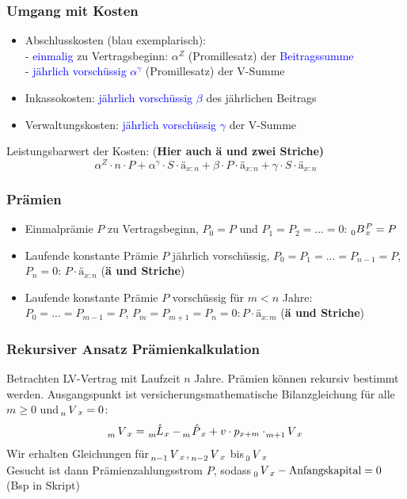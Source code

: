 \documentclass[12pt]{report}
\theoremstyle{dotless}
\theoremstyle{definition}
\begin{document}
\subsubsection{Umgang mit Kosten}
\begin{itemize}
\item Abschlusskosten (blau exemplarisch):\\
- \textcolor{blue}{einmalig} zu Vertragsbeginn: $\alpha^Z$ (Promillesatz) der \textcolor{blue}{Beitragssumme}\\
- \textcolor{blue}{jährlich vorschüssig $\alpha^\gamma$} (Promillesatz) der V-Summe
\item Inkassokosten: \textcolor{blue}{jährlich vorschüssig $\beta$} des jährlichen Beitrags
\item Verwaltungskosten: \textcolor{blue}{jährlich vorschüssig $\gamma$} der V-Summe
\end{itemize}
Leistungsbarwert der Kosten: (\textbf{Hier auch ä und zwei Striche)}
\begin{equation}
\alpha^Z \cdot n \cdot P + \alpha^\gamma \cdot S \cdot ä_{x:n} + \beta \cdot P \cdot ä_{x:n} + \gamma \cdot S \cdot ä_{x:n}
\end{equation}

\subsubsection{Prämien}
\begin{itemize}
\item Einmalprämie $P$ zu Vertragsbeginn, $P_0=P$ und $P_1=P_2=...=0$: $\tensor[_0]{B}{}_x^P = P$
\item Laufende konstante Prämie $P$ jährlich vorschüssig, $P_0=P_1=...=P_{n-1}=P$, $P_n=0$: $P\cdot ä_{x:n}$ (\textbf{ä und Striche})
\item Laufende konstante Prämie $P$ vorschüssig für $m<n$ Jahre: $P_0=...=P_{m-1}=P$, $P_m=P_{m+1}=P_n=0: P\cdot ä_{x:m}$ (\textbf{ä und Striche})
\end{itemize}

\subsubsection{Rekursiver Ansatz Prämienkalkulation}
Betrachten LV-Vertrag mit Laufzeit $n$ Jahre. Prämien können rekursiv bestimmt werden. Ausgangspunkt ist versicherungsmathematische Bilanzgleichung für alle $m\geq 0$ und $\tensor[_n]{V}{}_x=0$:
\begin{equation}
\tensor[_m]{V}{}_x = \tensor[_m]{\hat{L}}{}_x - \tensor[_m]{\hat{P}}{}_x + v \cdot p_{x+m} \cdot \tensor[_{m+1}]{V}{}_x
\end{equation}
Wir erhalten Gleichungen für $\tensor[_{n-1}]{V}{}_x$, $\tensor[_{n-2}]{V}{}_x$ bis $ \tensor[_0]{V}{}_x$ \\
Gesucht ist dann Prämienzahlungsstrom $P$, sodass $\tensor[_0]{V}{}_x - \text{Anfangskapital} =0$ (Bsp in Skript)\\
\end{document}
